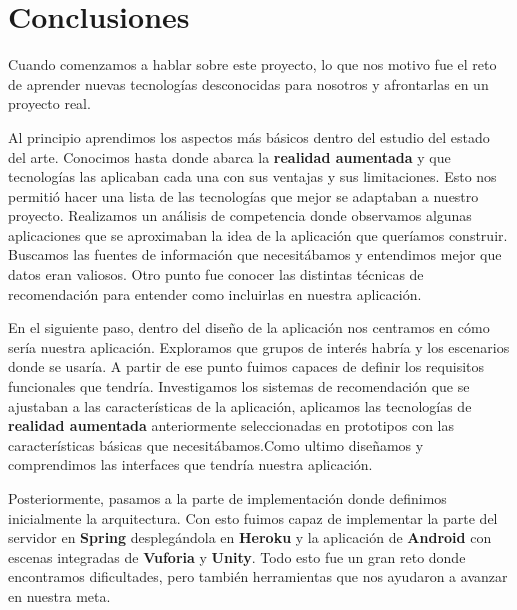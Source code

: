 
\cleardoublepage


\chapter{Conclusiones}
\label{makereference5}
Cuando comenzamos a hablar sobre este proyecto, lo que nos motivo fue el
 reto de aprender nuevas tecnologías desconocidas para nosotros y afrontarlas
 en un proyecto real.  

Al principio aprendimos los aspectos más básicos dentro del estudio del
 estado del arte. Conocimos hasta donde abarca la \textbf{realidad aumentada}
  y que tecnologías las aplicaban cada una con sus ventajas y sus
 limitaciones. Esto nos permitió hacer una lista de las tecnologías
 que mejor se adaptaban a nuestro proyecto. Realizamos un análisis de
 competencia donde observamos algunas aplicaciones que se aproximaban la
 idea de la aplicación que queríamos construir. Buscamos las fuentes de
 información que necesitábamos y entendimos mejor que datos eran valiosos.
 Otro punto fue conocer las distintas técnicas de recomendación para entender como incluirlas en nuestra aplicación. 

En el siguiente paso, dentro del diseño de la aplicación nos centramos en
 cómo sería nuestra aplicación. Exploramos que grupos de interés habría y
 los escenarios donde se usaría. A partir de ese punto fuimos capaces de
 definir los requisitos funcionales que tendría. Investigamos los sistemas
 de recomendación que se ajustaban a las características de la aplicación,
 aplicamos las tecnologías de \textbf{realidad aumentada} anteriormente
 seleccionadas en prototipos con las características básicas que
 necesitábamos.Como ultimo diseñamos y comprendimos las interfaces que
 tendría nuestra aplicación. 

Posteriormente, pasamos a la parte de implementación donde definimos
 inicialmente la arquitectura. Con esto fuimos capaz de implementar
 la parte del servidor en \textbf{Spring} desplegándola en \textbf{Heroku}
 y la aplicación de \textbf{Android} con escenas integradas de \textbf{Vuforia} y
 \textbf{Unity}. Todo esto fue un gran reto donde encontramos dificultades,
 pero también herramientas que nos ayudaron a avanzar en nuestra meta. 

